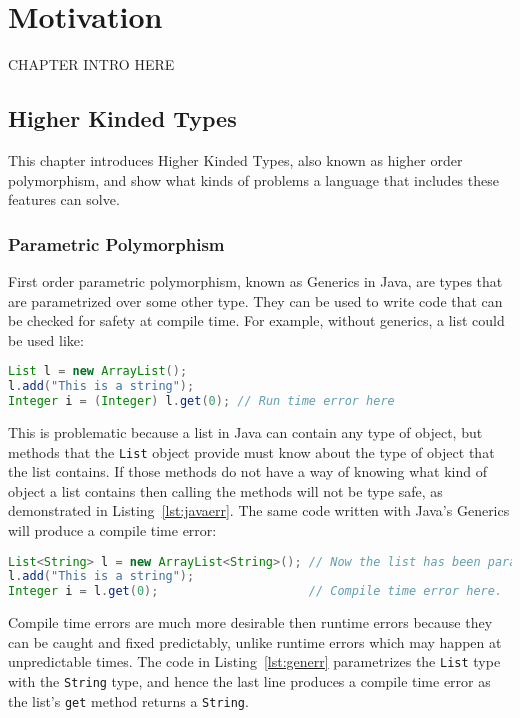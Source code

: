 \chapter{Motivation}\label{sec:motivation}
CHAPTER INTRO HERE

\section{Higher Kinded Types}
This chapter introduces Higher Kinded Types, also known as higher order
polymorphism, and show what kinds of problems a language that includes these
features can solve.

\subsection{Parametric Polymorphism}\label{sec:generics}
First order parametric polymorphism, known as Generics in Java, are types that
are parametrized over some other type. They can be used to write code that can
be checked for safety at compile time. For example, without generics, a list
could be used like:

\begin{lstlisting}[caption=Runtime error that could be avoided, language=Java, label={lst:javaerr}]
List l = new ArrayList();
l.add("This is a string");
Integer i = (Integer) l.get(0); // Run time error here
\end{lstlisting}

This is problematic because a list in Java can contain any type of object, but
methods that the \lstinline{List} object provide must know about the type of
object that the list contains. If those methods do not have a way of knowing
what kind of object a list contains then calling the methods will not be type
safe, as demonstrated in Listing~\ref{lst:javaerr}. The same code written with
Java's Generics will produce a compile time error:

\begin{lstlisting}[caption=Compile time error, language=Java, label={lst:generr}]
List<String> l = new ArrayList<String>(); // Now the list has been parametrized with a type
l.add("This is a string");
Integer i = l.get(0);                     // Compile time error here.
\end{lstlisting}

Compile time errors are much more desirable then runtime errors because they
can be caught and fixed predictably, unlike runtime errors which may happen at
unpredictable times. The code in Listing~\ref{lst:generr} parametrizes the
\lstinline{List} type with the \lstinline{String} type, and hence the last line
produces a compile time error as the list's \lstinline{get} method returns a
\lstinline{String}. 

